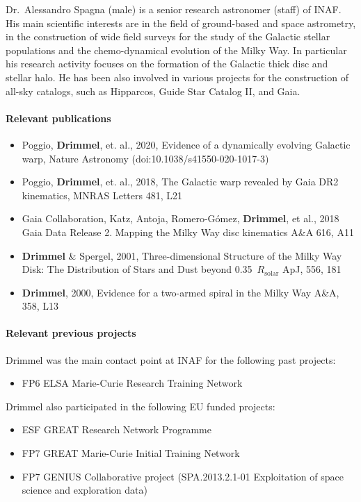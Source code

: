 Dr.~Alessandro Spagna (male) is a senior research astronomer (staff) of INAF. His main scientific interests are in the field of ground-based and space astrometry, in the construction of wide field surveys for the study of the Galactic stellar populations and the chemo-dynamical evolution of the Milky Way. In particular his research activity focuses on the formation of the Galactic thick disc and stellar halo.
He has been also involved in various projects for the construction of all-sky catalogs, such as Hipparcos, Guide Star Catalog II, and Gaia. 


\paragraph{Relevant publications}
\begin{itemize}
    \item Poggio, \textbf{Drimmel}, et. al., 2020, Evidence of a dynamically evolving Galactic warp, Nature Astronomy (doi:10.1038/s41550-020-1017-3)
    \item Poggio, \textbf{Drimmel}, et. al., 2018, The Galactic warp revealed by Gaia DR2 kinematics, MNRAS Letters 481, L21
    \item  Gaia Collaboration, Katz, Antoja, Romero-G\'omez, \textbf{Drimmel}, et al., 2018 Gaia Data Release 2. Mapping the Milky Way disc kinematics A\&A 616, A11
    \item \textbf{Drimmel} \& Spergel, 2001, Three-dimensional Structure of the Milky Way Disk: The Distribution of Stars and Dust beyond 0.35~$R_\mathrm{solar}$ ApJ, 556, 181
    \item \textbf{Drimmel}, 2000, Evidence for a two-armed spiral in the Milky Way A\&A, 358, L13
\end{itemize}

\paragraph{Relevant previous projects}

Drimmel was the main contact point at INAF for the following past projects:
\begin{itemize}
    \item FP6 ELSA Marie-Curie Research Training Network
\end{itemize}
Drimmel also participated in the following EU funded projects: 
\begin{itemize}
    \item ESF GREAT Research Network Programme 
    \item FP7 GREAT Marie-Curie Initial Training Network
    \item FP7 GENIUS Collaborative project (SPA.2013.2.1-01 Exploitation of space science and exploration data)
\end{itemize}


